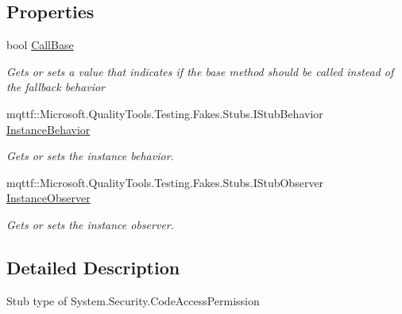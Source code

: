 \subsection*{Properties}
\begin{DoxyCompactItemize}
\item 
bool \hyperlink{class_system_1_1_security_1_1_fakes_1_1_stub_code_access_permission_a3b0ed6b61f9a1188e5ce7041720a6457}{Call\-Base}
\begin{DoxyCompactList}\small\item\em Gets or sets a value that indicates if the base method should be called instead of the fallback behavior\end{DoxyCompactList}\item 
mqttf\-::\-Microsoft.\-Quality\-Tools.\-Testing.\-Fakes.\-Stubs.\-I\-Stub\-Behavior \hyperlink{class_system_1_1_security_1_1_fakes_1_1_stub_code_access_permission_ac7ca92b56416392ba6193ec390bd772e}{Instance\-Behavior}
\begin{DoxyCompactList}\small\item\em Gets or sets the instance behavior.\end{DoxyCompactList}\item 
mqttf\-::\-Microsoft.\-Quality\-Tools.\-Testing.\-Fakes.\-Stubs.\-I\-Stub\-Observer \hyperlink{class_system_1_1_security_1_1_fakes_1_1_stub_code_access_permission_a4f9c5af3cacdbf5baa430e4344455217}{Instance\-Observer}
\begin{DoxyCompactList}\small\item\em Gets or sets the instance observer.\end{DoxyCompactList}\end{DoxyCompactItemize}


\subsection{Detailed Description}
Stub type of System.\-Security.\-Code\-Access\-Permission



